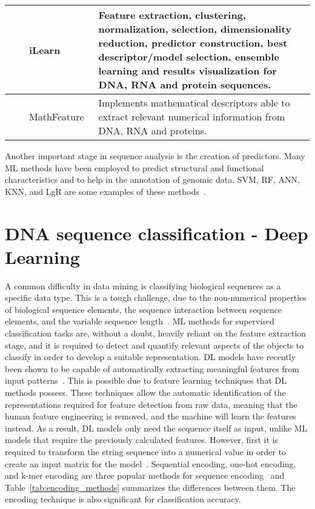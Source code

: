\begin{table}[ht]
\begin{tabular}{lp{2cm}p{3.5cm}p{7cm}}
	\citeyear{Chen2019ILearn:Data} & \citeauthor{Chen2019ILearn:Data} & iLearn~\cite{Chen2019ILearn:Data} & Feature extraction, clustering, normalization, selection, dimensionality reduction, predictor construction, best descriptor/model selection, ensemble learning and results visualization for \gls{DNA}, \gls{RNA} and protein sequences.\\\midrule
	
	\citeyear{Bonidia2021MathFeature:Descriptors} & \citeauthor{Bonidia2021MathFeature:Descriptors} & MathFeature~\cite{Bonidia2021MathFeature:Descriptors} & Implements mathematical descriptors able to extract relevant numerical information from \gls{DNA}, \gls{RNA} and proteins.\\
    
	\bottomrule
\end{tabular}
\end{table}

Another important stage in sequence analysis is the creation of predictors. Many \gls{ML} methods have been employed to predict structural and functional characteristics and to help in the annotation of genomic data. \gls{SVM}, \gls{RF}, \gls{ANN}, \gls{KNN}, and \gls{LgR} are some examples of these methods~\cite{Chen2019ILearn:Data}.



\section{DNA sequence classification - Deep Learning}\label{sec:dna-dl}

A common difficulty in data mining is classifying biological sequences as a specific data type. This is a tough challenge, due to the non-numerical properties of biological sequence elements, the sequence interaction between sequence elements, and the variable sequence length~\cite{Yang2020ReviewDNA}. \gls{ML} methods for supervised classification tasks are, without a doubt, heavily reliant on the feature extraction stage, and it is required to detect and quantify relevant aspects of the objects to classify in order to develop a suitable representation. \gls{DL} models have recently been shown to be capable of automatically extracting meaningful features from input patterns~\cite{LoBosco2017DeepClassification}. This is possible due to feature learning techniques that \gls{DL} methods possess. These techniques allow the automatic identification of the representations required for feature detection from raw data, meaning that the human feature engineering is removed, and the machine will learn the features instead. As a result, \gls{DL} models only need the sequence itself as input, unlike \gls{ML} models that require the previously calculated features. However, first it is required to transform the string sequence into a numerical value in order to create an input matrix for the model~\cite{Yang2020ReviewDNA}. Sequential encoding, one-hot encoding, and k-mer encoding are three popular methods for sequence encoding~\cite{Choong2017EvaluationMethod} and Table~\ref{tab:encoding_methods} summarizes the differences between them. The encoding technique is also significant for classification accuracy.

